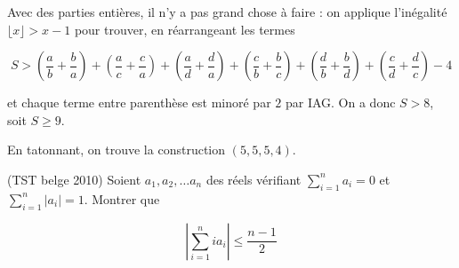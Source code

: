 \begin{sol}
Avec des parties entières, il n'y a pas grand chose à faire : on applique l'inégalité $\lfloor x \rfloor >x-1$ pour trouver, en réarrangeant les termes

\[S > \left(\frac{a}{b}+ \frac{b}{a}\right) + \left(\frac{a}{c}+ \frac{c}{a}\right)+\left(\frac{a}{d}+ \frac{d}{a}\right) +\left(\frac{c}{b}+ \frac{b}{c}\right) +\left(\frac{d}{b}+ \frac{b}{d}\right) + \left(\frac{c}{d}+ \frac{d}{c}\right)-4\]

et chaque terme entre parenthèse est minoré par $2$ par IAG. On a donc $S>8$, soit $S\geqslant 9$.

En tatonnant, on trouve la construction $(5,5,5,4)$.
\end{sol}

\begin{exo}
(TST belge 2010)
Soient $a_1,a_2,\ldots a_n$ des réels vérifiant $\sum_{i=1}^{n} a_i=0$ et $\sum_{i=1}^{n} |a_i| =1$. Montrer que

\[\left| \sum_{i=1}^{n} ia_i \right| \leqslant \frac{n-1}2\]
\end{exo}

